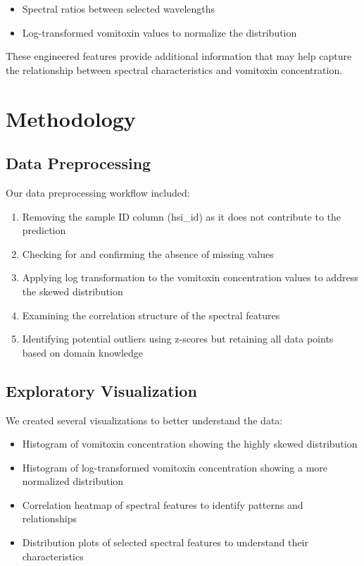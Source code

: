 \documentclass[12pt,a4paper]{article}
\begin{document}
\begin{itemize}
    \item Spectral ratios between selected wavelengths
    \item Log-transformed vomitoxin values to normalize the distribution
\end{itemize}

These engineered features provide additional information that may help capture the relationship between spectral characteristics and vomitoxin concentration.

\section{Methodology}

\subsection{Data Preprocessing}

Our data preprocessing workflow included:

\begin{enumerate}
    \item Removing the sample ID column (hsi\_id) as it does not contribute to the prediction
    \item Checking for and confirming the absence of missing values
    \item Applying log transformation to the vomitoxin concentration values to address the skewed distribution
    \item Examining the correlation structure of the spectral features
    \item Identifying potential outliers using z-scores but retaining all data points based on domain knowledge
\end{enumerate}

\subsection{Exploratory Visualization}

We created several visualizations to better understand the data:

\begin{itemize}
    \item Histogram of vomitoxin concentration showing the highly skewed distribution
    \item Histogram of log-transformed vomitoxin concentration showing a more normalized distribution
    \item Correlation heatmap of spectral features to identify patterns and relationships
    \item Distribution plots of selected spectral features to understand their characteristics
\end{itemize}
\end{document}
